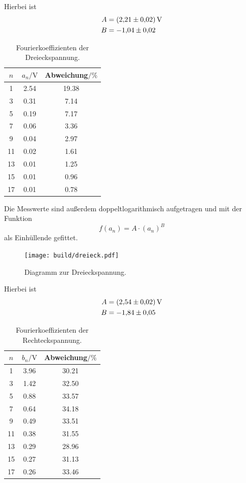 Hierbei ist
\begin{align}
    A &= \SI{2.21\pm0.02}{\volt}\\
    B &= \num{-1.04\pm0.02}
\end{align}
%
\begin{table}[H]
    \caption{Fourierkoeffizienten der Dreieckspannung.}
    \label{tab:dreieck}
    \centering
    \begin{tabular}{S[table-format=2.0(0)e0] S[table-format=1.2(0)e0] S[table-format=2.2]}
        \toprule
        {$n$} & {$a_n/\si{\volt}$} & {Abweichung$/\si{\percent}$}\\
          & 2.54 & 19.38 \\
        3  & 0.31 & 7.14 \\
        5  & 0.19 & 7.17 \\
        7  & 0.06 & 3.36 \\
        9  & 0.04 & 2.97 \\
        11 & 0.02 & 1.61 \\
        13 & 0.01 & 1.25 \\
        15 & 0.01 & 0.96 \\
        17 & 0.01 & 0.78 \\
        \bottomrule
    \end{tabular}
\end{table}
\noindent
Die Messwerte sind außerdem doppeltlogarithmisch aufgetragen und mit der Funktion
\begin{equation}
    f(a_n) = A\cdot(a_n)^B
\end{equation}
als Einhüllende gefittet.
\begin{figure}[H]
    \centering
    \caption{Diagramm zur Dreieckspannung.}
    \texttt{[image: build/dreieck.pdf]}
\end{figure}
Hierbei ist
\begin{align}
    A &= \SI{2.54\pm0.02}{\volt}\\
    B &= \num{-1.84\pm0.05}
\end{align}
%
\begin{table}[H]
    \caption{Fourierkoeffizienten der Rechteckspannung.}
    \label{tab:rechteck}
    \centering
    \begin{tabular}{S[table-format=2.0(0)e0] S[table-format=1.2(0)e0] S[table-format=2.2]}
        \toprule
        {$n$} & {$b_n/\si{\volt}$} & {Abweichung$/\si{\percent}$}\\
          & 3.96 & 30.21 \\
        3  & 1.42 & 32.50 \\
        5  & 0.88 & 33.57 \\
        7  & 0.64 & 34.18 \\
        9  & 0.49 & 33.51 \\
        11 & 0.38 & 31.55 \\
        13 & 0.29 & 28.96 \\
        15 & 0.27 & 31.13 \\
        17 & 0.26 & 33.46 \\
        \bottomrule
    \end{tabular}
\end{table}
